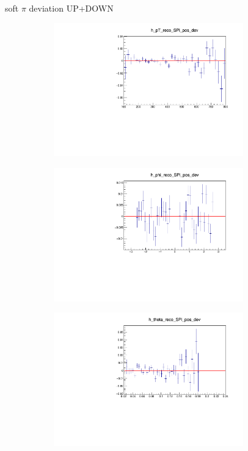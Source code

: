 \documentclass[11pt]{beamer}
\begin{document}
\begin{frame}{soft $\pi$ deviation UP+DOWN}
\begin{figure}
\begin{subfigure}{0.45\textwidth}
\includegraphics[width=0.9\textwidth]{fourth/up_plus_down_pdf/pT_2.pdf}
\end{subfigure}
\begin{subfigure}{0.45\textwidth}
\includegraphics[width=0.9\textwidth]{fourth/up_plus_down_pdf/phi_2.pdf}
\end{subfigure}
\begin{subfigure}{0.45\textwidth}
\includegraphics[width=0.9\textwidth]{fourth/up_plus_down_pdf/theta_2.pdf}

\end{subfigure}
\end{figure}
\end{frame}
\end{document}
